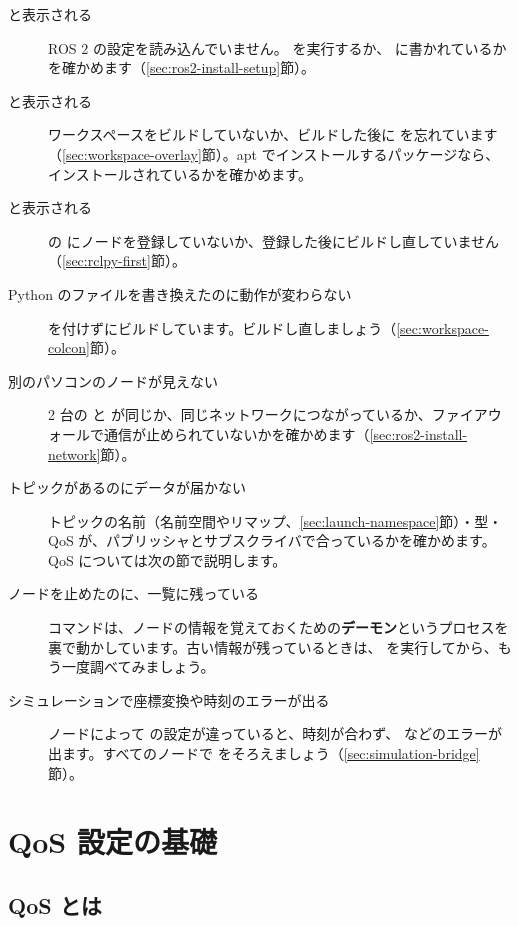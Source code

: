 \begin{description}
  \item[ と表示される] ROS 2 の設定を読み込んでいません。 を実行するか、 に書かれているかを確かめます（\ref{sec:ros2-install-setup}節）。
  \item[ と表示される] ワークスペースをビルドしていないか、ビルドした後に  を忘れています（\ref{sec:workspace-overlay}節）。apt でインストールするパッケージなら、インストールされているかを確かめます。
  \item[ と表示される]  の  にノードを登録していないか、登録した後にビルドし直していません（\ref{sec:rclpy-first}節）。
  \item[Python のファイルを書き換えたのに動作が変わらない]  を付けずにビルドしています。ビルドし直しましょう（\ref{sec:workspace-colcon}節）。
  \item[別のパソコンのノードが見えない] 2 台の  と  が同じか、同じネットワークにつながっているか、ファイアウォールで通信が止められていないかを確かめます（\ref{sec:ros2-install-network}節）。
  \item[トピックがあるのにデータが届かない] トピックの名前（名前空間やリマップ、\ref{sec:launch-namespace}節）・型・QoS が、パブリッシャとサブスクライバで合っているかを確かめます。QoS については次の節で説明します。
  \item[ノードを止めたのに、一覧に残っている]  コマンドは、ノードの情報を覚えておくための\textbf{デーモン}というプロセスを裏で動かしています。古い情報が残っているときは、 を実行してから、もう一度調べてみましょう。
  \item[シミュレーションで座標変換や時刻のエラーが出る] ノードによって  の設定が違っていると、時刻が合わず、 などのエラーが出ます。すべてのノードで  をそろえましょう（\ref{sec:simulation-bridge}節）。
\end{description}

\section{QoS 設定の基礎}
\label{sec:debug-qos}

\subsection{QoS とは}

